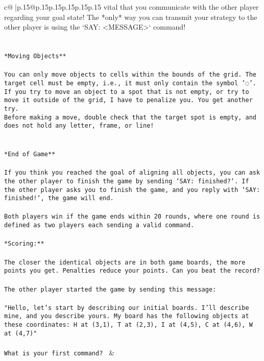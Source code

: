 \documentclass{article}
\begin{document}
{\begin{supertabular}{c@{$\;$}|p{.15\linewidth}@{}p{.15\linewidth}p{.15\linewidth}p{.15\linewidth}p{.15\linewidth}p{.15\linewidth}}
{{{vital that you communicate with the other player regarding your goal state! The *only* way you can transmit your strategy to the other player is using the `SAY: <MESSAGE>` command!\\ \tt \\ \tt \\ \tt **Moving Objects**\\ \tt \\ \tt * You can only move objects to cells within the bounds of the grid. The target cell must be empty, i.e., it must only contain the symbol '◌'.\\ \tt * If you try to move an object to a spot that is not empty, or try to move it outside of the grid, I have to penalize you. You get another try.\\ \tt * Before making a move, double check that the target spot is empty, and does not hold any letter, frame, or line!\\ \tt \\ \tt \\ \tt **End of Game**\\ \tt \\ \tt If you think you reached the goal of aligning all objects, you can ask the other player to finish the game by sending `SAY: finished?`. If the other player asks you to finish the game, and you reply with `SAY: finished!`, the game will end.\\ \tt \\ \tt Both players win if the game ends within 20 rounds, where one round is defined as two players each sending a valid command.\\ \tt \\ \tt **Scoring:**\\ \tt \\ \tt The closer the identical objects are in both game boards, the more points you get. Penalties reduce your points. Can you beat the record?\\ \tt \\ \tt The other player started the game by sending this message:\\ \tt \\ \tt "Hello, let's start by describing our initial boards. I'll describe mine, and you describe yours. My board has the following objects at these coordinates: H at (3,1), T at (2,3), I at (4,5), C at (4,6), W at (4,7)"\\ \tt \\ \tt What is your first command? 
	  } 
	   } 
	   } 
	 & \\ 
 


\end{supertabular}}
\end{document}
